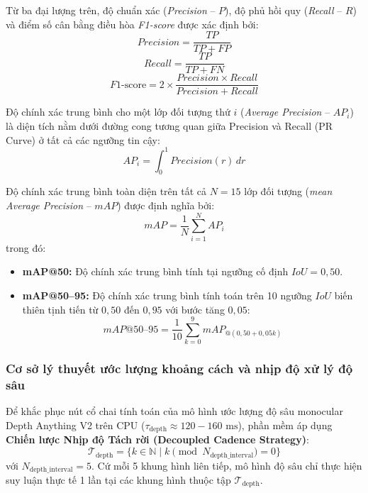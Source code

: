 Từ ba đại lượng trên, độ chuẩn xác (\textit{Precision} -- $P$), độ phủ hồi quy (\textit{Recall} -- $R$) và điểm số cân bằng điều hòa \textit{F1-score} được xác định bởi:
\begin{equation}
\label{eq:precision_metric}
Precision = \frac{TP}{TP + FP}
\end{equation}
\begin{equation}
\label{eq:recall_metric}
Recall = \frac{TP}{TP + FN}
\end{equation}
\begin{equation}
\label{eq:f1_metric}
F1\text{-score} = 2 \times \frac{Precision \times Recall}{Precision + Recall}
\end{equation}

Độ chính xác trung bình cho một lớp đối tượng thứ $i$ (\textit{Average Precision} -- $AP_i$) là diện tích nằm dưới đường cong tương quan giữa Precision và Recall (PR Curve) ở tất cả các ngưỡng tin cậy:
\begin{equation}
\label{eq:ap_metric}
AP_i = \int_0^1 Precision(r) \, dr
\end{equation}

Độ chính xác trung bình toàn diện trên tất cả $N = 15$ lớp đối tượng (\textit{mean Average Precision} -- $mAP$) được định nghĩa bởi:
\begin{equation}
\label{eq:map_metric}
mAP = \frac{1}{N} \sum_{i=1}^N AP_i
\end{equation}
trong đó:
\begin{itemize}
    \item \textbf{mAP@50:} Độ chính xác trung bình tính tại ngưỡng cố định $IoU = 0,50$.
    \item \textbf{mAP@50--95:} Độ chính xác trung bình tính toán trên 10 ngưỡng $IoU$ biến thiên tịnh tiến từ $0,50$ đến $0,95$ với bước tăng $0,05$:
    \begin{equation}
    \label{eq:map5095_metric}
    mAP@50\text{--}95 = \frac{1}{10} \sum_{k=0}^9 mAP_{@(0,50 + 0,05k)}
    \end{equation}
\end{itemize}

\subsubsection{Cơ sở lý thuyết ước lượng khoảng cách và nhịp độ xử lý độ sâu}
Để khắc phục nút cổ chai tính toán của mô hình ước lượng độ sâu monocular Depth Anything V2 trên CPU ($\tau_{\text{depth}} \approx 120-160\text{ ms}$), phần mềm áp dụng \textbf{Chiến lược Nhịp độ Tách rời (Decoupled Cadence Strategy)}:
\begin{equation}
\label{eq:depth_cadence}
\mathcal{T}_{\text{depth}} = \{ k \in \mathbb{N} \mid k \pmod{N_{\text{depth\_interval}}} = 0 \}
\end{equation}
với $N_{\text{depth\_interval}} = 5$. Cứ mỗi 5 khung hình liên tiếp, mô hình độ sâu chỉ thực hiện suy luận thực tế 1 lần tại các khung hình thuộc tập $\mathcal{T}_{\text{depth}}$. 

